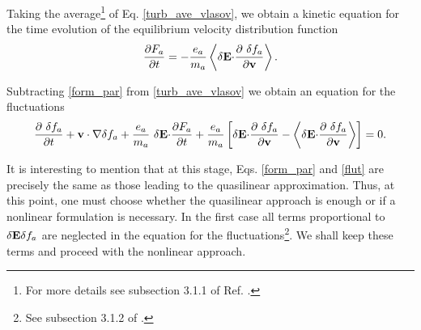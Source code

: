 \documentclass[12pt,a4paper,ruledheader]{report}
\begin{document}
Taking the average\footnote{For more details see subsection 3.1.1
  of Ref. \cite{Tigik2015}.} of Eq. \eqref{turb_ave_vlasov}, we
obtain a kinetic equation for the time evolution of the equilibrium
velocity distribution function
\begin{equation}
\frac{\partial F_a}{\partial t}
=-\frac{e_a}{m_a}\left< \delta {\bf E \cdot}
\frac{\partial\ \delta f_a}{\partial \bf v}\right>.
\label{form_par}
\end{equation}

Subtracting \eqref{form_par} from \eqref{turb_ave_vlasov} we obtain
an equation for the fluctuations
\begin{equation}
\frac{\partial\ \delta f_a}{\partial t}+{\bf v \cdot \nabla} \delta f_a
+\frac{e_a}{m_a}\ \delta {\bf E \cdot} \frac{\partial F_a}{\partial t}
+\frac{e_a}{m_a}\left[\delta {\bf E \cdot} \frac{\partial\ \delta f_a}{\partial \bf v}
-\left< \delta {\bf E \cdot}
\frac{\partial\ \delta f_a}{\partial \bf v}\right>\right]=0.
\label{flut}
\end{equation}

It is interesting to mention that at this stage, Eqs. \eqref{form_par}
and \eqref{flut} are precisely the same as those leading to the
quasilinear approximation.
Thus, at this point, one must choose whether the quasilinear approach
is enough or if a nonlinear formulation is necessary. In the first case
all terms proportional to $\delta {\bf E} \delta f_a$ are neglected in
the equation for the fluctuations\footnote{See subsection 3.1.2 of
  \cite{Tigik2015}.}. We shall keep these terms and proceed with the
nonlinear approach.
\end{document}
